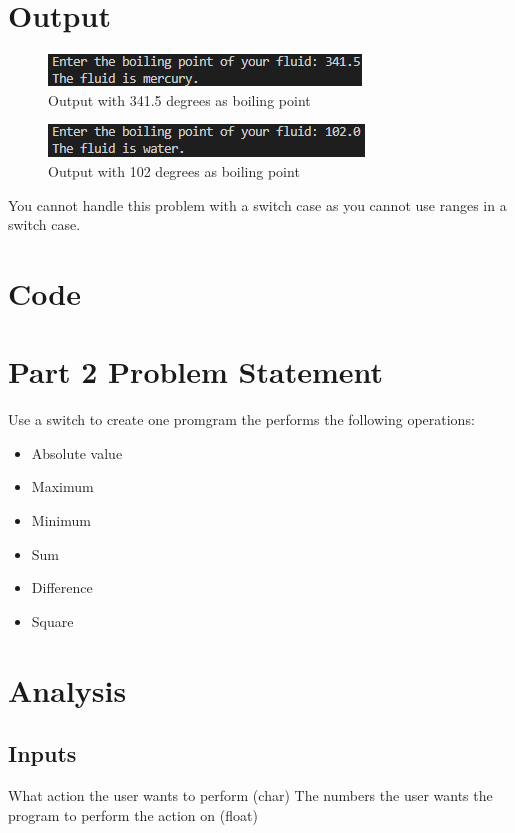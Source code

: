 \documentclass{article}
\begin{document}
\begin{flushleft}
  \section{Output}
    \begin{figure}[!h]
      \begin{centering}
        \includegraphics[scale=1]{Q1_p1.png}
        \caption{Output with 341.5 degrees as boiling point}
      \end{centering}
    \end{figure}
    \begin{figure}[!h]
      \begin{centering}
        \includegraphics[scale=1]{Q1_p2.png}
        \caption{Output with 102 degrees as boiling point}
      \end{centering}
    \end{figure}
  You cannot handle this problem with a switch case as you cannot use ranges in a switch case.
  \section{Code}
  
  \newpage
  \section{Part 2 Problem Statement}
  Use a switch to create one promgram the performs the following operations:
  \begin{itemize}
    \item Absolute value
    \item Maximum
    \item Minimum
    \item Sum
    \item Difference
    \item Square
  \end{itemize}
  \section{Analysis}
  \subsection{Inputs}
  What action the user wants to perform (char)
  The numbers the user wants the program to perform the action on (float)

\end{flushleft}
\end{document}
